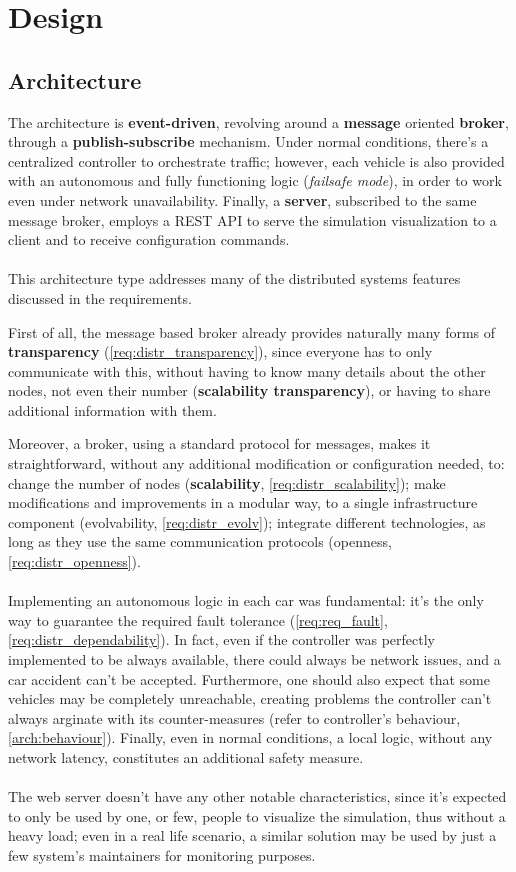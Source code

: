 \section{Design}\label{design}

\subsection{Architecture}\label{arch:architecture}
The architecture is \textbf{event-driven}, revolving around a \textbf{message}
oriented \textbf{broker}, through a \textbf{publish-subscribe} mechanism. Under
normal conditions, there's a centralized controller to orchestrate traffic;
however, each vehicle is also provided with an autonomous and fully functioning
logic (\textit{failsafe mode}), in order to work even under network
unavailability. Finally, a \textbf{server}, subscribed to the same message
broker, employs a REST API to serve the simulation visualization to a client and
to receive configuration commands.
\\
\\
This architecture type addresses many of the distributed systems features
discussed in the requirements.

First of all, the message based broker already provides naturally many forms of
\textbf{transparency} (\ref{req:distr_transparency}), since everyone has to
only communicate with this, without having to know many details about the
other nodes, not even their number (\textbf{scalability transparency}),
or having to share additional information with them.

Moreover, a broker, using a standard protocol for messages, makes it
straightforward, without any additional modification or configuration needed,
to: change the number of nodes (\textbf{scalability},
\ref{req:distr_scalability}); make modifications and improvements in a modular
way, to a single infrastructure component (evolvability, \ref{req:distr_evolv});
integrate different technologies, as long as they use the same communication
protocols (openness, \ref{req:distr_openness}).
\\
\\
Implementing an autonomous logic in each car was fundamental: it's the only way
to guarantee the required fault tolerance (\ref{req:req_fault},
\ref{req:distr_dependability}). In fact, even if the controller was perfectly
implemented to be always available, there could always be network issues, and a
car accident can't be accepted. Furthermore, one should also expect that some
vehicles may be completely unreachable, creating problems the controller can't
always arginate with its counter-measures (refer to controller's behaviour,
\ref{arch:behaviour}). Finally, even in normal conditions, a local logic,
without any network latency, constitutes an additional safety measure.
\\
\\
The web server doesn't have any other notable characteristics, since it's expected
to only be used by one, or few, people to visualize the simulation, thus without a
heavy load; even in a real life scenario, a similar solution may be used by just
a few system's maintainers for monitoring purposes.

